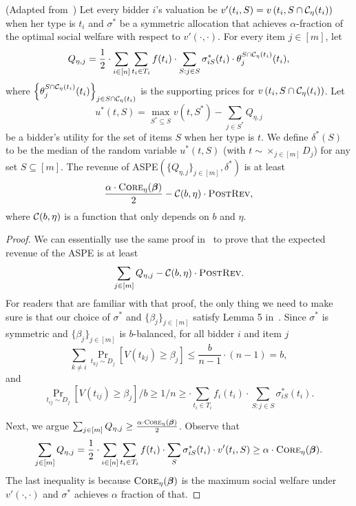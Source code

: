 \begin{lemma}\label{lem:Q_j}(Adapted from~\cite{CaiZ17})
	Let every bidder $i$'s valuation be  $v'(t_i,S)=v\left(t_i,S\cap {\mathcal{C}}_{\eta}(t_i)\right)$ when her type is $t_{i}$ and $\sigma^*$ be a symmetric allocation that achieves $\alpha$-fraction of the optimal social welfare with respect to $v'(\cdot,\cdot)$. 
	For every item $j\in[m]$, let $$Q_{\eta,j}=\frac{1}{2}\cdot \sum_{i\in[n]} \sum_{t_i\in T_i}f(t_i)\cdot\sum_{S:j\in S}\sigma_{iS}^{*}(t_i)\cdot \theta_j^{S\cap  {\mathcal{C}}_{\eta}(t_i)}(t_i),$$ where $\left\{\theta_j^{S\cap  {\mathcal{C}}_{\eta}(t_i)}(t_i)\right\}_{j\in S\cap  {\mathcal{C}}_{\eta}(t_i)}$ is the supporting prices for $v\left(t_i,S\cap  {\mathcal{C}}_{\eta}(t_i)\right)$.
	 Let $$u^*(t, S)=\max_{S^*\subseteq S} v(t, S^*)-\sum_{j\in S^*} Q_{\eta,j}$$ be a bidder's utility for the set of items $S$ when her type is $t$. 
	 We define $\delta^*(S)$ to be the median of the random variable $u^{*}(t,S)$ (with $t\sim \times_{j\in[m]}D_j$) for any set $S\subseteq [m]$.
	  The revenue of ASPE$\left(\{Q_{\eta,j}\}_{j\in[m]}, \delta^*\right)$ is at least $$\frac{\alpha\cdot \textsc{Core}_{\eta}(\boldsymbol{\beta})}{2}-{\mathcal{C}}(b,\eta)\cdot \textsc{PostRev},$$ where ${\mathcal{C}}(b,\eta)$ is a function that only depends on $b$ and $\eta$. %
	\end{lemma}
\begin{proof}
We can essentially use the same proof in~\cite{CaiZ17} to prove that the expected revenue of the ASPE is at least $$\sum_{j\in[m]} Q_{\eta,j}-{\mathcal{C}}(b,\eta)\cdot \textsc{PostRev}.$$ For readers that are familiar with that proof, the only thing we need to make sure is that our choice of $\sigma^*$ and $\{\beta_j\}_{j\in[m]}$ satisfy Lemma 5 in~\cite{CaiZ17}. Since $\sigma^*$ is symmetric and $\{\beta_j\}_{j\in[m]}$ is $b$-balanced, for all bidder $i$ and item $j$ $$\sum_{k\neq i}\Pr_{t_{kj}\sim D_{j}}\left[V(t_{kj})\geq \beta_{j}\right]\leq \frac{b}{n-1}\cdot (n-1)=b,$$ and $$\Pr_{t_{ij}\sim D_j}\left[V(t_{ij}) \geq \beta_j\right]/b\geq 1/n\geq  \cdot \sum_{t_i\in T_i} f_i(t_i)\cdot \sum_{S: j\in S} \sigma^*_{iS}(t_i).$$

Next, we argue $\sum_{j\in[m]} Q_{\eta,j}\geq \frac{\alpha\cdot \textsc{Core}_{\eta}(\boldsymbol{\beta})}{2}$. Observe that $$\sum_{j\in[m]} Q_{\eta,j}=\frac{1}{2}\cdot \sum_{i\in[n]} \sum_{t_i\in T_i}f(t_i)\cdot\sum_{S}\sigma_{iS}^{*}(t_i)\cdot v'(t_i,S)\geq \alpha\cdot \textsc{Core}_{\eta}(\boldsymbol{\beta}).$$ The last inequality is because $\textsc{Core}_{\eta}(\boldsymbol{\beta})$ is the maximum social welfare under $v'(\cdot,\cdot)$ and $\sigma^*$ achieves $\alpha$ fraction of that.
\end{proof}	
	
